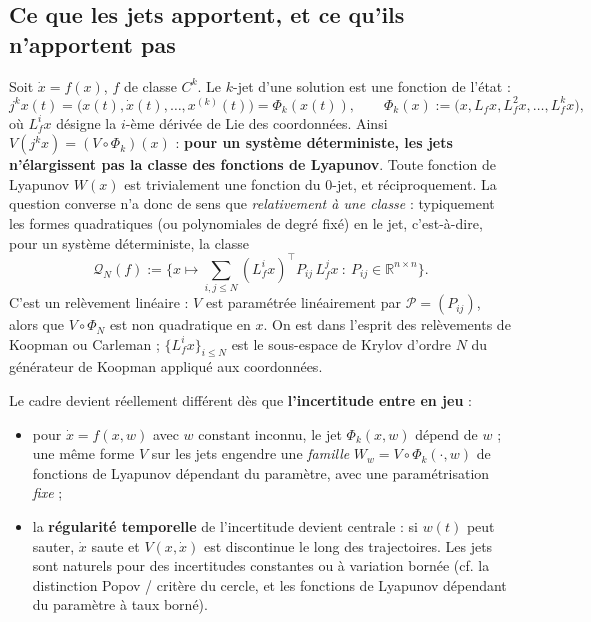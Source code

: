 \documentclass[11pt,a4paper]{article}
\theoremstyle{definition}
\theoremstyle{remark}
\newcommand{\R}{\mathbb{R}}
\newcommand{\jet}[2]{j^{#1}#2}
\newcommand{\tr}{^{\top}}
\begin{document}
\subsection{Ce que les jets apportent, et ce qu'ils n'apportent pas}
Soit $\dot x = f(x)$, $f$ de classe $C^k$. Le $k$-jet d'une solution est une fonction de l'état :
\begin{equation}\label{eq:Phi}
\jet{k}{x}(t) = \big(x(t),\dot x(t),\dots,x^{(k)}(t)\big) = \Phi_k(x(t)),\qquad \Phi_k(x) := \big(x, L_f x, L_f^2 x,\dots,L_f^k x\big),
\end{equation}
où $L_f^i x$ désigne la $i$-ème dérivée de Lie des coordonnées. Ainsi $V(\jet{k}{x}) = (V\circ\Phi_k)(x)$ : \textbf{pour un système déterministe, les jets n'élargissent pas la classe des fonctions de Lyapunov}. Toute fonction de Lyapunov $W(x)$ est trivialement une fonction du $0$-jet, et réciproquement. La question converse n'a donc de sens que \emph{relativement à une classe} : typiquement les formes quadratiques (ou polynomiales de degré fixé) en le jet, c'est-à-dire, pour un système déterministe, la classe
\begin{equation}\label{eq:classe}
\mathcal Q_N(f) := \Big\{ x\mapsto \sum_{i,j\le N} (L_f^i x)\tr P_{ij}\, L_f^j x \ :\ P_{ij}\in\R^{n\times n}\Big\}.
\end{equation}
C'est un relèvement linéaire : $V$ est paramétrée linéairement par $\mathcal P=(P_{ij})$, alors que $V\circ\Phi_N$ est non quadratique en $x$. On est dans l'esprit des relèvements de Koopman ou Carleman ; $\{L_f^i x\}_{i\le N}$ est le sous-espace de Krylov d'ordre $N$ du générateur de Koopman appliqué aux coordonnées.

Le cadre devient réellement différent dès que \textbf{l'incertitude entre en jeu} :
\begin{itemize}[nosep]
\item pour $\dot x = f(x,w)$ avec $w$ constant inconnu, le jet $\Phi_k(x,w)$ dépend de $w$ ; une même forme $V$ sur les jets engendre une \emph{famille} $W_w = V\circ\Phi_k(\cdot,w)$ de fonctions de Lyapunov dépendant du paramètre, avec une paramétrisation \emph{fixe} ;
\item la \textbf{régularité temporelle} de l'incertitude devient centrale : si $w(t)$ peut sauter, $\dot x$ saute et $V(x,\dot x)$ est discontinue le long des trajectoires. Les jets sont naturels pour des incertitudes constantes ou à variation bornée (cf. la distinction Popov / critère du cercle, et les fonctions de Lyapunov dépendant du paramètre à taux borné).
\end{itemize}
\end{document}
